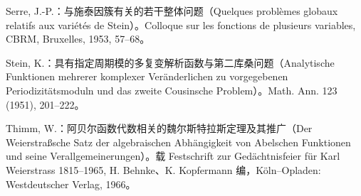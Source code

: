 \begin{description}[style=nextline,leftmargin=2em]
\item[{[61]}] Serre, J.-P.：与施泰因簇有关的若干整体问题（Quelques problèmes globaux relatifs aux variétés de Stein）。Colloque sur les fonctions de plusieurs variables, CBRM, Bruxelles, 1953, 57--68。
\item[{[62]}] Stein, K.：具有指定周期模的多复变解析函数与第二库桑问题（Analytische Funktionen mehrerer komplexer Veränderlichen zu vorgegebenen Periodizitätsmoduln und das zweite Cousinsche Problem）。Math. Ann. 123 (1951), 201--222。
\item[{[63]}] Thimm, W.：阿贝尔函数代数相关的魏尔斯特拉斯定理及其推广（Der Weierstraßsche Satz der algebraischen Abhängigkeit von Abelschen Funktionen und seine Verallgemeinerungen）。载 Festschrift zur Gedächtnisfeier für Karl Weierstrass 1815--1965, H. Behnke、K. Kopfermann 编，Köln--Opladen: Westdeutscher Verlag, 1966。
\end{description}
